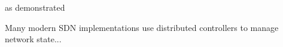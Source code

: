\projectname{} as demonstrated 

Many modern SDN implementations use distributed controllers to manage network state...
